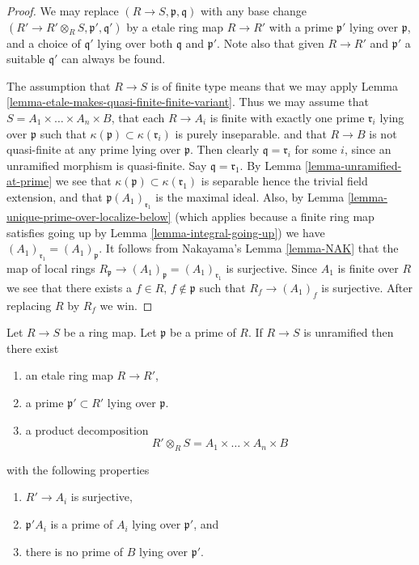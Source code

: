 \begin{proof}
We may replace $(R \to S, \mathfrak p, \mathfrak q)$
with any base change $(R' \to R'\otimes_R S, \mathfrak p', \mathfrak q')$
by a etale ring map $R \to R'$ with a prime $\mathfrak p'$
lying over $\mathfrak p$, and a choice of $\mathfrak q'$ lying over
both $\mathfrak q$ and $\mathfrak p'$. Note also that given
$R \to R'$ and $\mathfrak p'$ a suitable $\mathfrak q'$ can always
be found.

\medskip\noindent
The assumption that $R \to S$ is of finite type means that we may apply
Lemma \ref{lemma-etale-makes-quasi-finite-finite-variant}. Thus we may
assume that $S = A_1 \times \ldots \times A_n \times B$, that
each $R \to A_i$ is finite with exactly one prime $\mathfrak r_i$
lying over $\mathfrak p$ such that
$\kappa(\mathfrak p) \subset \kappa(\mathfrak r_i)$ is purely inseparable.
and that $R \to B$ is not quasi-finite at any prime lying over $\mathfrak p$.
Then clearly $\mathfrak q = \mathfrak r_i$ for some $i$, since
an unramified morphism is quasi-finite. Say $\mathfrak q = \mathfrak r_1$.
By Lemma \ref{lemma-unramified-at-prime} we see that
$\kappa(\mathfrak p) \subset \kappa(\mathfrak r_1)$
is separable hence the trivial field extension, and that
$\mathfrak p(A_1)_{\mathfrak r_1}$ is the maximal ideal.
Also, by Lemma \ref{lemma-unique-prime-over-localize-below}
(which applies because a finite ring map satisfies going up by
Lemma \ref{lemma-integral-going-up})
we have $(A_1)_{\mathfrak r_1} = (A_1)_{\mathfrak p}$.
It follows from Nakayama's Lemma \ref{lemma-NAK}
that the map of local rings
$R_{\mathfrak p} \to (A_1)_{\mathfrak p} = (A_1)_{\mathfrak r_1}$
is surjective. Since $A_1$ is finite over $R$ we see that there
exists a $f \in R$, $f \not \in \mathfrak p$ such that
$R_f \to (A_1)_f$ is surjective. After replacing $R$ by $R_f$ we win.
\end{proof}

\begin{lemma}
\label{lemma-etale-makes-unramfied-closed}
Let $R \to S$ be a ring map.
Let $\mathfrak p$ be a prime of $R$.
If $R \to S$ is unramified then there exist
\begin{enumerate}
\item an etale ring map $R \to R'$,
\item a prime $\mathfrak p' \subset R'$ lying over $\mathfrak p$.
\item a product decomposition
$$
R' \otimes_R S = A_1 \times \ldots \times A_n \times B
$$
\end{enumerate}
with the following properties
\begin{enumerate}
\item $R' \to A_i$ is surjective,
\item $\mathfrak p'A_i$ is a prime of $A_i$ lying over $\mathfrak p'$, and
\item there is no prime of $B$ lying over $\mathfrak p'$.
\end{enumerate}
\end{lemma}


